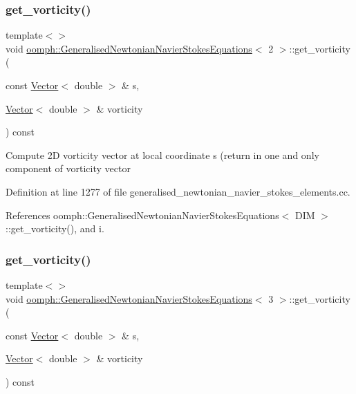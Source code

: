 \subsubsection{\texorpdfstring{get\+\_\+vorticity()}{get\_vorticity()}\hspace{0.1cm}{\footnotesize\ttfamily [2/3]}}
{\footnotesize\ttfamily template$<$$>$ \\
void \hyperlink{classoomph_1_1GeneralisedNewtonianNavierStokesEquations}{oomph\+::\+Generalised\+Newtonian\+Navier\+Stokes\+Equations}$<$ 2 $>$\+::get\+\_\+vorticity (\begin{DoxyParamCaption}\item[{const \hyperlink{classoomph_1_1Vector}{Vector}$<$ double $>$ \&}]{s,  }\item[{\hyperlink{classoomph_1_1Vector}{Vector}$<$ double $>$ \&}]{vorticity }\end{DoxyParamCaption}) const}

Compute 2D vorticity vector at local coordinate s (return in one and only component of vorticity vector 

Definition at line 1277 of file generalised\+\_\+newtonian\+\_\+navier\+\_\+stokes\+\_\+elements.\+cc.



References oomph\+::\+Generalised\+Newtonian\+Navier\+Stokes\+Equations$<$ D\+I\+M $>$\+::get\+\_\+vorticity(), and i.

\mbox{\label{classoomph_1_1GeneralisedNewtonianNavierStokesEquations_a9f5de20a733b2ea0927c097d89fe7dba}} 
\subsubsection{\texorpdfstring{get\+\_\+vorticity()}{get\_vorticity()}\hspace{0.1cm}{\footnotesize\ttfamily [3/3]}}
{\footnotesize\ttfamily template$<$$>$ \\
void \hyperlink{classoomph_1_1GeneralisedNewtonianNavierStokesEquations}{oomph\+::\+Generalised\+Newtonian\+Navier\+Stokes\+Equations}$<$ 3 $>$\+::get\+\_\+vorticity (\begin{DoxyParamCaption}\item[{const \hyperlink{classoomph_1_1Vector}{Vector}$<$ double $>$ \&}]{s,  }\item[{\hyperlink{classoomph_1_1Vector}{Vector}$<$ double $>$ \&}]{vorticity }\end{DoxyParamCaption}) const}



